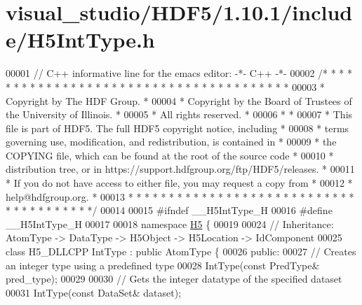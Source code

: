 \hypertarget{visual__studio_2_h_d_f5_21_810_81_2include_2_h5_int_type_8h_source}{}\section{visual\+\_\+studio/\+H\+D\+F5/1.10.1/include/\+H5\+Int\+Type.h}
\label{visual__studio_2_h_d_f5_21_810_81_2include_2_h5_int_type_8h_source}

\begin{DoxyCode}
00001 \textcolor{comment}{// C++ informative line for the emacs editor: -*- C++ -*-}
00002 \textcolor{comment}{/* * * * * * * * * * * * * * * * * * * * * * * * * * * * * * * * * * * * * * *}
00003 \textcolor{comment}{ * Copyright by The HDF Group.                                               *}
00004 \textcolor{comment}{ * Copyright by the Board of Trustees of the University of Illinois.         *}
00005 \textcolor{comment}{ * All rights reserved.                                                      *}
00006 \textcolor{comment}{ *                                                                           *}
00007 \textcolor{comment}{ * This file is part of HDF5.  The full HDF5 copyright notice, including     *}
00008 \textcolor{comment}{ * terms governing use, modification, and redistribution, is contained in    *}
00009 \textcolor{comment}{ * the COPYING file, which can be found at the root of the source code       *}
00010 \textcolor{comment}{ * distribution tree, or in https://support.hdfgroup.org/ftp/HDF5/releases.  *}
00011 \textcolor{comment}{ * If you do not have access to either file, you may request a copy from     *}
00012 \textcolor{comment}{ * help@hdfgroup.org.                                                        *}
00013 \textcolor{comment}{ * * * * * * * * * * * * * * * * * * * * * * * * * * * * * * * * * * * * * * */}
00014 
00015 \textcolor{preprocessor}{#ifndef \_\_H5IntType\_H}
00016 \textcolor{preprocessor}{#define \_\_H5IntType\_H}
00017 
00018 \textcolor{keyword}{namespace }\hyperlink{namespace_h5}{H5} \{
00019 
00024 \textcolor{comment}{//  Inheritance: AtomType -> DataType -> H5Object -> H5Location -> IdComponent}
00025 \textcolor{keyword}{class }H5\_DLLCPP IntType : \textcolor{keyword}{public} AtomType \{
00026    \textcolor{keyword}{public}:
00027         \textcolor{comment}{// Creates an integer type using a predefined type}
00028         IntType(\textcolor{keyword}{const} PredType& pred\_type);
00029 
00030         \textcolor{comment}{// Gets the integer datatype of the specified dataset}
00031         IntType(\textcolor{keyword}{const} DataSet& dataset);

\end{DoxyCode}
